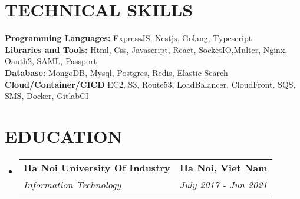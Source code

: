 \documentclass[letterpaper,11pt]{article}
\makeatletter
\newcommand{\resumeSubheading}[4]{
  \vspace{-2pt}\item
    \begin{tabular*}{1.0\textwidth}[t]{l@{\extracolsep{\fill}}r}
      \textbf{\large#1} & \textbf{\small #2} \\
      \textit{\large#3} & \textit{\small #4} \\
      
    \end{tabular*}\vspace{-7pt}
}
\newcommand{\resumeSubHeadingListStart}{\begin{itemize}[leftmargin=0.0in, label={}]}
\newcommand{\resumeSubHeadingListEnd}{\end{itemize}}
\makeatother
\begin{document}
 \vspace{-12pt}

\section{\color{airforceblue}TECHNICAL SKILLS}
 \begin{itemize}[leftmargin=0in, label={}]
    \small{\item{
     \textbf{\normalsize{Programming Languages:}}{ \normalsize{ExpressJS, Nestjs, Golang, Typescript}} \\
      \vspace{1.2pt}
      \textbf{\normalsize{Libraries and Tools:}}{ \normalsize{Html, Css, Javascript, React, SocketIO,Multer, Nginx, Oauth2, SAML,  Passport}} \\
      \vspace{1.2pt}
      \textbf{\normalsize{Database:}}{ \normalsize{MongoDB, Mysql, Postgres, Redis, Elastic Search}} \\
      \vspace{1.2pt}
     \textbf{\normalsize{Cloud/Container/CICD}}{ \normalsize{EC2, S3, Route53, LoadBalancer, CloudFront, SQS, SMS,  Docker, GitlabCI}}
     }}
 \end{itemize}
 \vspace{-12pt}

\section{\color{airforceblue}EDUCATION}
  \resumeSubHeadingListStart
    \resumeSubheading
      {Ha Noi University Of Industry}{Ha Noi, Viet Nam}
      {Information Technology}{July 2017 - Jun 2021}
    \vspace{-4pt}
  \resumeSubHeadingListEnd
  \vspace{-10pt}

  
\end{document}
